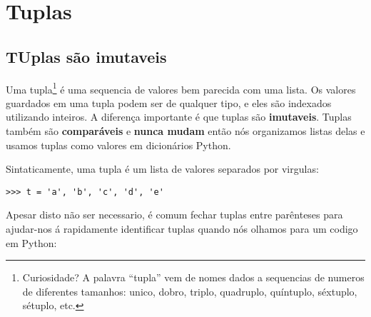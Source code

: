 
\chapter{Tuplas}
\label{tuplechap}

\section{TUplas são imutaveis}


Uma tupla\footnote{Curiosidade? A palavra ``tupla'' vem de nomes 
dados a sequencias de numeros de diferentes tamanhos: unico, dobro,
triplo, quadruplo, quíntuplo, séxtuplo, sétuplo, etc.} é uma sequencia
de valores bem parecida com uma lista.
Os valores guardados em uma tupla podem ser de qualquer tipo, e
eles são indexados utilizando inteiros.
A diferença importante é que tuplas são {\bf imutaveis}.
Tuplas também são {\bf comparáveis} e {\bf nunca mudam} então nós
organizamos listas delas e usamos tuplas como valores em dicionários Python.


Sintaticamente, uma tupla é um lista de valores separados por virgulas:

\beforeverb
\begin{verbatim}
>>> t = 'a', 'b', 'c', 'd', 'e'
\end{verbatim}
\afterverb
%
Apesar disto não ser necessario, é comum fechar tuplas entre parênteses
para ajudar-nos á rapidamente identificar tuplas quando nós olhamos
para um codigo em Python:

